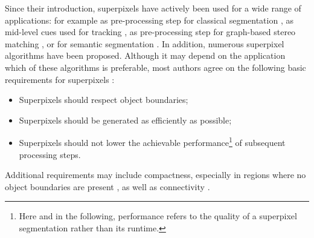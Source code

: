 Since their introduction, superpixels have actively been used for a wide range of applications: for example as pre-processing step for classical segmentation \cite{RenMalik:2003,RohkohlEngel:2007}, as mid-level cues used for tracking \cite{ShuWangHuchuanLuFanYangMingHsuanYang:2011}, as pre-processing step for graph-based stereo matching \cite{YuhangZhangHartleyMashfordBurn:2011}, or for semantic segmentation \cite{GuptaArbelaezMalik:2013}. In addition, numerous superpixel algorithms have been proposed. Although it may depend on the application which of these algorithms is preferable, most authors agree on the following basic requirements for superpixels \cite{LevinshteinStereKutulakosFleetDickinsonSiddiqi:2009,AchantaShajiSmithLucchiFuaSuesstrunk:2010,LiuTuzelRamalingamChellappa:2011}:
\begin{itemize}
	\item Superpixels should respect object boundaries;
	\item Superpixels should be generated as efficiently as possible;
	\item Superpixels should not lower the achievable performance\footnote{Here and in the following, performance refers to the quality of a superpixel segmentation rather than its runtime.} of subsequent processing steps.
\end{itemize}
Additional requirements may include compactness, especially in regions where no object boundaries are present \cite{LevinshteinStereKutulakosFleetDickinsonSiddiqi:2009,SchickFischerStiefelhagen:2012}, as well as connectivity \cite{LevinshteinStereKutulakosFleetDickinsonSiddiqi:2009}.

